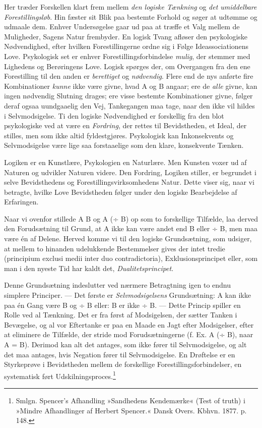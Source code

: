 \documentclass[12pt,a4paper,openany]{book}
\newcommand{\opage}[1]{\marginnote{\footnotesize\textit{[#1]}}}
\begin{document}
Her træder Forskellen klart frem mellem \emph{den logiske Tænkning} og
\emph{det umiddelbare Forestillingsløb}. Hin fæster sit Blik paa
bestemte Forhold og søger at udtømme og udmaale dem. Enhver Undersøgelse
gaar ud paa at træffe et Valg mellem de Muligheder, Sagens Natur
frembyder. En logisk Tvang afløser den psykologiske Nødvendighed, efter
hvilken Forestillingerne ordne sig i Følge Ideassociationens Love.
Psykologisk set er enhver Forestillingsforbindelse \emph{mulig}, der
stemmer med Lighedens og Berøringens Love. Logisk spørges der, om
Overgangen fra den ene Forestilling til den anden er \emph{berettiget}
og \emph{nødvendig}. Flere end de nys anførte fire Kombinationer
\emph{kunne} ikke være givne, hvad A og B angaar; ere de \emph{alle}
givne, kan ingen nødvendig Slutning drages; ere visse bestemte
Kombinationer givne, følger deraf ogsaa uundgaaelig den Vej, Tankegangen
maa tage, naar den ikke vil hildes i Selvmodsigelse. Ti den logiske
Nødvendighed er forskellig fra den blot psykologiske ved at være en
\emph{Fordring}, der rettes til Bevidstheden, et Ideal, der stilles, men
som ikke altid fyldestgjøres. Psykologisk kan Inkonsekvents og
Selvmodsigelse være lige saa forstaaelige som den klare, konsekvente
Tænken.

Logiken er en Kunstlære, Psykologien en Naturlære. Men Kunsten voxer ud
af Naturen og udvikler Naturen videre. Den Fordring, Logiken stiller, er
begrundet i selve Bevidsthedens og Forestillingsvirksomhedens Natur.
Dette viser sig, naar vi betragte, hvilke Love Bevidstheden følger under
den logiske Bearbejdelse af Erfaringen.

Naar vi ovenfor stillede A B og A (÷ B) op som to forskellige Tilfælde,
laa derved den Forudsætning til Grund, at A ikke kan være andet end B
eller ÷ B, men maa være én af Delene. Herved komme vi til den logiske
Grundsætning, som udsiger, at mellem to hinanden udelukkende
Bestemmelser gives der intet tredie (principium exclusi medii inter duo
contradictoria), Exklusionsprincipet eller, som man i den nyeste Tid har
kaldt det, \emph{Dualitetsprincipet}.


\opage{216}Denne Grundsætning indeslutter ved nærmere Betragtning igen
to endnu simplere Principer. --- Det første er \emph{Selvmodsigelsens}
Grundsætning: A kan ikke paa én Gang være B og ÷ B eller: B er ikke ÷ B.
--- Dette Princip spiller en Rolle ved al Tænkning. Det er fra først af
Modsigelsen, der sætter Tanken i Bevægelse, og al vor Eftertanke er paa
en Maade en Jagt efter Modsigelser, efter at eliminere de Tilfælde, der
stride mod Forudsætningerne (f. Ex. A (÷ B), naar A = B). Derimod kan
alt det antages, som ikke fører til Selvmodsigelse, og alt det maa
antages, hvis Negation fører til Selvmodsigelse. En Drøftelse er en
Styrkeprøve i Bevidstheden mellem de forskellige
Forestillingsforbindelser, en systematisk ført
Udskilningsproces.\footnote[1]{Smlgn. Spencer’s Afhandling »Sandhedens
Kendemærke« (Test of truth) i »Mindre Afhandlinger af Herbert Spencer.«
Dansk Overs. Kbhvn. 1877. p. 148.}
\end{document}
